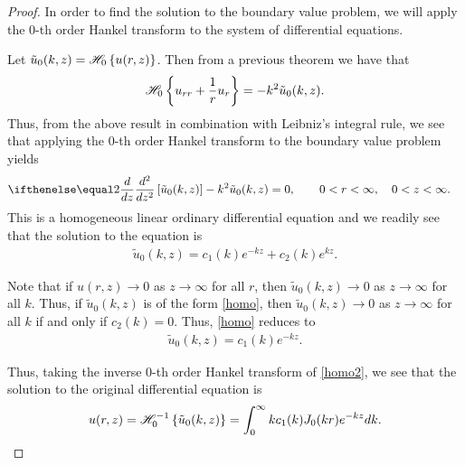 \begin{proof}
  In order to find the solution to the boundary value problem, we will apply
  the 0-th order Hankel transform to the system of differential equations.

  Let $\tilde{u}_0(k, z) = \mathscr{H}_{ {0} }\left\{ {u(r, z)} \right\}$. Then
  from a previous theorem we have that
  \begin{align}\label{hankel0}
    \mathscr{H}_{ {0} }\left\{ {u_{rr} + \frac{1}{r}u_r} \right\} = -k^2 \tilde{u}_0(k, z).
  \end{align}
  Thus, from the above result in combination with Leibniz's integral rule, we see that
  applying the 0-th order Hankel transform to the boundary value problem yields
  \begin{align*}
    &\der{z}{2}\left[\tilde{u}_0(k, z)\right] - k^2 \tilde{u}_0(k, z) = 0, \qquad 0 < r < \infty, \quad 0 < z < \infty.
  \end{align*}
  This is a homogeneous linear ordinary differential equation and we readily see that
  the solution to the equation is
  \begin{align}\label{homo}
    \tilde{u}_0(k, z) = c_1(k) e^{-kz} + c_2(k) e^{kz}.
  \end{align}

  Note that if $u(r,z) \to 0$ as $z \to \infty$ for all $r$, then
  $\tilde{u}_0(k, z) \to 0$ as $z \to \infty$ for all $k$. Thus, if
  $\tilde{u}_0(k, z)$ is of the form \eqref{homo},
  then $\tilde{u}_0(k, z) \to 0$ as $z\to\infty$ for all $k$
  if and only if $c_2(k) = 0$. Thus, \eqref{homo} reduces to
  \begin{align}\label{homo2}
    \tilde{u}_0(k, z) = c_1(k) e^{-kz}.
  \end{align}

  Thus, taking the inverse 0-th order Hankel transform of \eqref{homo2}, we see that
  the solution to the original differential equation is
  \begin{align*}
    u(r, z) = \mathscr{H}^{-1}_{ {0} }\left\{ {\tilde{u}_0(k, z)} \right\} = \int_0^\infty k c_1(k) J_0(k r)e^{-kz} dk.
  \end{align*}


\end{proof}
